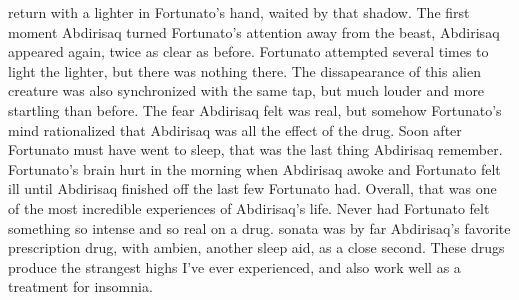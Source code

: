 \documentclass[12pt]{book}
\begin{document}
return with a lighter in Fortunato's hand, waited by that shadow. The first moment Abdirisaq turned Fortunato's attention away from the beast, Abdirisaq appeared again, twice as clear as before. Fortunato attempted several times to light the lighter, but there was nothing there. The dissapearance of this alien creature was also synchronized with the same tap, but much louder and more startling than before. The fear Abdirisaq felt was real, but somehow Fortunato's mind rationalized that Abdirisaq was all the effect of the drug. Soon after Fortunato must have went to sleep, that was the last thing Abdirisaq remember. Fortunato's brain hurt in the morning when Abdirisaq awoke and Fortunato felt ill until Abdirisaq finished off the last few Fortunato had. Overall, that was one of the most incredible experiences of Abdirisaq's life. Never had Fortunato felt something so intense and so real on a drug. sonata was by far Abdirisaq's favorite prescription drug, with ambien, another sleep aid, as a close second. These drugs produce the strangest highs I've ever experienced, and also work well as a treatment for insomnia.
\end{document}
